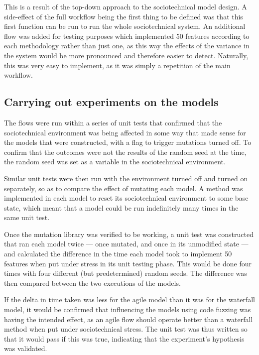 This is a result of the top-down approach to the sociotechnical model design. A side-effect of the full workflow being the first thing to be defined was that this first function can be run to run the whole sociotechnical system. An additional flow was added for testing purposes which implemented 50 features according to each methodology rather than just one, as this way the effects of the variance in the system would be more pronounced and therefore easier to detect. Naturally, this was very easy to implement, as it was simply a repetition of the main workflow.\par

\subsection{Carrying out experiments on the models}
The flows were run within a series of unit tests that confirmed that the sociotechnical environment was being affected in some way that made sense for the models that were constructed, with a flag to trigger mutations turned off. To confirm that the outcomes were not the results of the random seed at the time, the random seed was set as a variable in the sociotechnical environment.\par

Similar unit tests were then run with the environment turned off and turned on separately, so as to compare the effect of mutating each model. A method was implemented in each model to reset its sociotechnical environment to some base state, which meant that a model could be run indefinitely many times in the same unit test. \par

Once the mutation library was verified to be working, a unit test was constructed that ran each model twice --- once mutated, and once in its unmodified state --- and calculated the difference in the time each model took to implement 50 features when put under stress in its unit testing phase. This would be done four times with four different (but predetermined) random seeds. The difference was then compared between the two executions of the models. \par

If the delta in time taken was less for the agile model than it was for the waterfall model, it would be confirmed that influencing the models using code fuzzing was having the intended effect, as an agile flow should operate better than a waterfall method when put under sociotechnical stress. The unit test was thus written so that it would pass if this was true, indicating that the experiment's hypothesis was validated. \par

